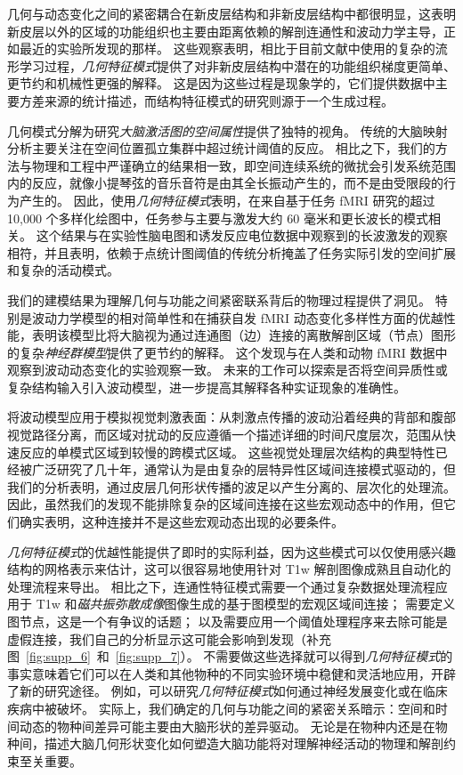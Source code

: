 \documentclass[lang=cn,a4paper,newtx,citestyle=gb7714-2015, bibstyle=gb7714-2015]{elegantpaper}
\begin{document}
几何与动态变化之间的紧密耦合在新皮层结构和非新皮层结构中都很明显，这表明新皮层以外的区域的功能组织也主要由距离依赖的解剖连通性和波动力学主导，正如最近的实验所发现的那样\cite{raut2021global,hamid2021wave,yousefi2021propagating}。
这些观察表明，相比于目前文献中使用的复杂的流形学习过程，\textit{几何特征模式}提供了对非新皮层结构中潜在的功能组织梯度更简单、更节约和机械性更强的解释。
这是因为这些过程是现象学的，它们提供数据中主要方差来源的统计描述，而结构特征模式的研究则源于一个生成过程。


几何模式分解为研究\textit{大脑激活图的空间属性}提供了独特的视角。
传统的大脑映射分析主要关注在空间位置孤立集群中超过统计阈值的反应。
相比之下，我们的方法与物理和工程中严谨确立的结果相一致，即空间连续系统的微扰会引发系统范围内的反应，就像小提琴弦的音乐音符是由其全长振动产生的，而不是由受限段的行为产生的。
因此，使用\textit{几何特征模式}表明，在来自基于任务 fMRI 研究的超过 10,000 个多样化绘图中，任务参与主要与激发大约 60 毫米和更长波长的模式相关。
这个结果与在实验性脑电图和诱发反应电位数据中观察到的长波激发的观察相符，并且表明，依赖于点统计图阈值的传统分析掩盖了任务实际引发的空间扩展和复杂的活动模式。


我们的建模结果为理解几何与功能之间紧密联系背后的物理过程提供了洞见。
特别是波动力学模型的相对简单性和在捕获自发 fMRI 动态变化多样性方面的优越性能，表明该模型比将大脑视为通过连通图（边）连接的离散解剖区域（节点）图形的复杂\textit{神经群模型}提供了更节约的解释。
这个发现与在人类和动物 fMRI 数据中观察到波动动态变化的实验观察一致。
未来的工作可以探索是否将空间异质性或复杂结构输入引入波动模型，进一步提高其解释各种实证现象的准确性。


将波动模型应用于模拟视觉刺激表面：从刺激点传播的波动沿着经典的背部和腹部视觉路径分离，而区域对扰动的反应遵循一个描述详细的时间尺度层次，范围从快速反应的单模式区域到较慢的跨模式区域。
这些视觉处理层次结构的典型特性已经被广泛研究了几十年，通常认为是由复杂的层特异性区域间连接模式驱动的，但我们的分析表明，通过皮层几何形状传播的波足以产生分离的、层次化的处理流。
因此，虽然我们的发现不能排除复杂的区域间连接在这些宏观动态中的作用，但它们确实表明，这种连接并不是这些宏观动态出现的必要条件。


\textit{几何特征模式}的优越性能提供了即时的实际利益，因为这些模式可以仅使用感兴趣结构的网格表示来估计，这可以很容易地使用针对 T1w 解剖图像成熟且自动化的处理流程来导出。
相比之下，连通性特征模式需要一个通过复杂数据处理流程应用于 T1w 和\textit{磁共振弥散成像}图像生成的基于图模型的宏观区域间连接；
需要定义图节点，这是一个有争议的话题；
以及需要应用一个阈值处理程序来去除可能是虚假连接，我们自己的分析显示这可能会影响到发现（补充图~\ref{fig:supp_6}~和~\ref{fig:supp_7}）。
不需要做这些选择就可以得到\textit{几何特征模式}的事实意味着它们可以在人类和其他物种的不同实验环境中稳健和灵活地应用，开辟了新的研究途径。
例如，可以研究\textit{几何特征模式}如何通过神经发展变化或在临床疾病中被破坏。
实际上，我们确定的几何与功能之间的紧密关系暗示：空间和时间动态的物种间差异可能主要由大脑形状的差异驱动。
无论是在物种内还是在物种间，描述大脑几何形状变化如何塑造大脑功能将对理解神经活动的物理和解剖约束至关重要。
\end{document}
